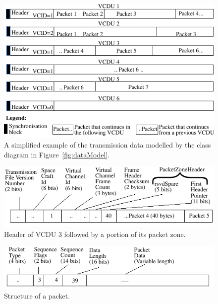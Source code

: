 \begin{figure}[h]
  \centering
    \includegraphics{images/transmissionData}
      \caption{A simplified example of the transmission data modelled by the class diagram in Figure~\ref{fig:dataModel}.}
      \label{fig:transmissionData}
\end{figure}

\begin{figure}[h]
  \centering
    \includegraphics{images/CADU}
      \caption{Header of VCDU 3 followed by a portion of its packet zone.}
      \label{fig:VCDU}
\end{figure}

\begin{figure}[h]
  \centering
    \includegraphics{images/packet}
      \caption{Structure of a packet.}
      \label{fig:packet}
\end{figure}







